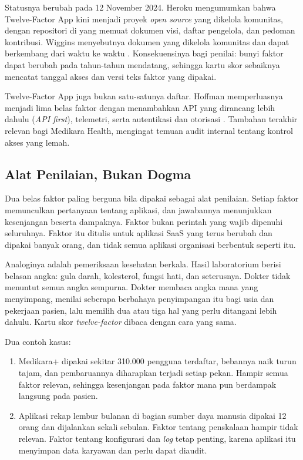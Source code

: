 Statusnya berubah pada 12 November 2024. Heroku mengumumkan bahwa Twelve-Factor App kini
menjadi proyek \textit{open source} yang dikelola komunitas, dengan repositori di
 yang memuat dokumen visi, daftar pengelola,
dan pedoman kontribusi. Wiggins menyebutnya dokumen yang dikelola komunitas dan dapat
berkembang dari waktu ke waktu \cite{c05-heroku2024}. Konsekuensinya bagi penilai: bunyi
faktor dapat berubah pada tahun-tahun mendatang, sehingga kartu skor sebaiknya mencatat
tanggal akses dan versi teks faktor yang dipakai.

Twelve-Factor App juga bukan satu-satunya daftar. Hoffman memperluasnya menjadi lima belas
faktor dengan menambahkan API yang dirancang lebih dahulu (\textit{API first}), telemetri,
serta autentikasi dan otorisasi \cite{c05-hoffman2016}. Tambahan terakhir relevan bagi
Medikara Health, mengingat temuan audit internal tentang kontrol akses yang lemah.

\subsection{Alat Penilaian, Bukan Dogma}

Dua belas faktor paling berguna bila dipakai sebagai alat penilaian. Setiap faktor
memunculkan pertanyaan tentang aplikasi, dan jawabannya menunjukkan kesenjangan beserta
dampaknya. Faktor bukan perintah yang wajib dipenuhi seluruhnya. Faktor itu ditulis untuk
aplikasi SaaS yang terus berubah dan dipakai banyak orang, dan tidak semua aplikasi
organisasi berbentuk seperti itu.

Analoginya adalah pemeriksaan kesehatan berkala. Hasil laboratorium berisi belasan angka:
gula darah, kolesterol, fungsi hati, dan seterusnya. Dokter tidak menuntut semua angka
sempurna. Dokter membaca angka mana yang menyimpang, menilai seberapa berbahaya
penyimpangan itu bagi usia dan pekerjaan pasien, lalu memilih dua atau tiga hal yang perlu
ditangani lebih dahulu. Kartu skor \textit{twelve-factor} dibaca dengan cara yang sama.

Dua contoh kasus:
\begin{enumerate}
  \item Medikara+ dipakai sekitar 310.000 pengguna terdaftar, bebannya naik turun tajam,
        dan pembaruannya diharapkan terjadi setiap pekan. Hampir semua faktor relevan,
        sehingga kesenjangan pada faktor mana pun berdampak langsung pada pasien.
  \item Aplikasi rekap lembur bulanan di bagian sumber daya manusia dipakai 12 orang dan
        dijalankan sekali sebulan. Faktor tentang penskalaan hampir tidak relevan. Faktor
        tentang konfigurasi dan \textit{log} tetap penting, karena aplikasi itu menyimpan
        data karyawan dan perlu dapat diaudit.
\end{enumerate}

